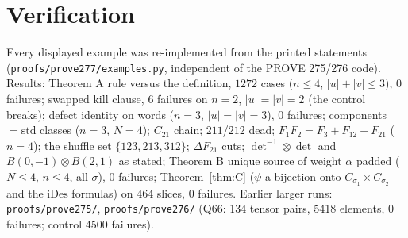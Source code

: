 \documentclass[11pt]{amsart}
\theoremstyle{definition}
\theoremstyle{remark}
\newcommand{\std}{\mathrm{std}}
\newcommand{\iDes}{\mathrm{iDes}}
\begin{document}
\appendix
\section{Verification}
Every displayed example was re-implemented from the printed statements (\texttt{proofs/prove277/examples.py}, independent of the PROVE 275/276 code). Results: Theorem A rule versus the definition, $1272$ cases ($n\le4$, $|u|+|v|\le3$), $0$ failures; swapped kill clause, $6$ failures on $n=2$, $|u|=|v|=2$ (the control breaks); defect identity on words ($n=3$, $|u|=|v|=3$), $0$ failures; components $=\std$ classes ($n=3$, $N=4$); $C_{21}$ chain; $211$/$212$ dead; $F_1F_2=F_3+F_{12}+F_{21}$ ($n=4$); the shuffle set $\{123,213,312\}$; $\Delta F_{21}$ cuts; $\det^{-1}\otimes\det$ and $B(0,-1)\otimes B(2,1)$ as stated; Theorem B unique source of weight $\alpha$ padded ($N\le4$, $n\le4$, all $\sigma$), $0$ failures; Theorem~\ref{thm:C} ($\psi$ a bijection onto $C_{\sigma_1}\times C_{\sigma_2}$ and the $\iDes$ formulas) on $464$ slices, $0$ failures. Earlier larger runs: \texttt{proofs/prove275/}, \texttt{proofs/prove276/} (Q66: 134 tensor pairs, 5418 elements, 0 failures; control 4500 failures).
\end{document}

